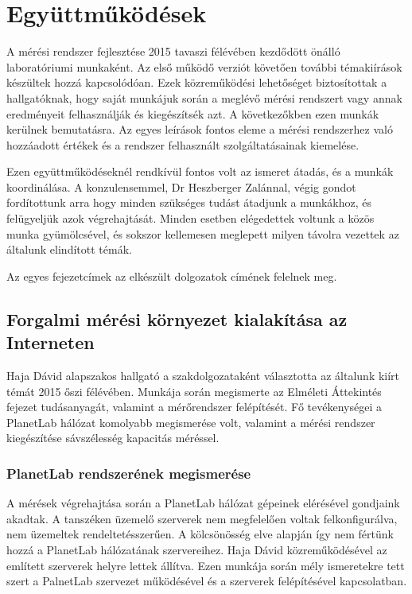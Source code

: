 \chapter{Együttműködések}

A mérési rendszer fejlesztése 2015 tavaszi félévében kezdődött önálló laboratóriumi munkaként. Az első működő verziót követően további témakiírások készültek hozzá kapcsolódóan. Ezek közreműködési lehetőséget biztosítottak a hallgatóknak, hogy saját munkájuk során a meglévő mérési rendszert vagy annak eredményeit felhasználják és kiegészítsék azt. A következőkben ezen munkák kerülnek bemutatásra. Az egyes leírások fontos eleme a mérési rendszerhez való hozzáadott értékek és a rendszer felhasznált szolgáltatásainak kiemelése.

Ezen együttműködéseknél rendkívül fontos volt az ismeret átadás, és a munkák koordinálása. A konzulensemmel, Dr Heszberger Zalánnal, végig gondot fordítottunk arra hogy minden szükséges tudást átadjunk a munkákhoz, és felügyeljük azok végrehajtását. Minden esetben elégedettek voltunk a közös munka gyümölcsével, és sokszor kellemesen meglepett milyen távolra vezettek az általunk elindított témák.

Az egyes fejezetcímek az elkészült dolgozatok címének felelnek meg.

\section{Forgalmi mérési környezet kialakítása az Interneten}


Haja Dávid alapszakos hallgató a szakdolgozataként választotta az általunk kiírt témát 2015 őszi félévében. Munkája során megismerte az Elméleti Áttekintés fejezet tudásanyagát, valamint a mérőrendszer felépítését. Fő tevékenységei a PlanetLab hálózat komolyabb megismerése volt, valamint a mérési rendszer kiegészítése sávszélesség kapacitás méréssel.

\subsection*{PlanetLab rendszerének megismerése}
A mérések végrehajtása során a PlanetLab hálózat gépeinek elérésével gondjaink akadtak. A tanszéken üzemelő szerverek nem megfelelően voltak felkonfigurálva, nem üzemeltek rendeltetésszerűen. A kölcsönösség elve alapján így nem fértünk hozzá a PlanetLab hálózatának szervereihez.
Haja Dávid közreműködésével az említett szerverek helyre lettek állítva. Ezen munkája során mély ismeretekre tett szert a PalnetLab szervezet működésével és a szerverek felépítésével kapcsolatban.


